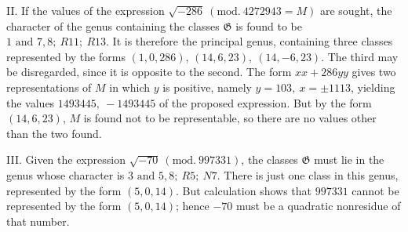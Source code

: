 II. If the values of the expression \(\surd{-286}\ (\mathrm{mod.}\ 4272943=M)\) are sought, the character of the genus containing the classes \(\mathfrak G\) is found to be \(1\text{ and }7,\allowbreak 8;\allowbreak \ R11;\allowbreak \ R13\). It is therefore the principal genus, containing three classes represented by the forms \((1,\allowbreak 0,\allowbreak 286)\), \((14,\allowbreak 6,\allowbreak 23),\allowbreak \ (14,\allowbreak -6,\allowbreak 23)\). The third may be disregarded, since it is opposite to the second. The form \(xx+286yy\) gives two representations of \(M\) in which \(y\) is positive, namely \(y=103,\allowbreak \ x=\pm1113\), yielding the values \(1493445,\allowbreak \ -1493445\) of the proposed expression. But by the form \((14,\allowbreak 6,\allowbreak 23)\), \(M\) is found not to be representable, so there are no values other than the two found.

\begin{samepage}
III. Given the expression \(\surd{-70}\ (\mathrm{mod.}\ 997331)\), the classes \(\mathfrak G\) must lie in the genus whose character is \(3\text{ and }5,\allowbreak 8;\allowbreak \ R5;\allowbreak \ N7\). There is just one class in this genus, represented by the form \((5,\allowbreak 0,\allowbreak 14)\). But calculation shows that \(997331\) cannot be represented by the form \((5,\allowbreak 0,\allowbreak 14)\); hence \(-70\) must be a quadratic nonresidue of that number.
\par\end{samepage}
